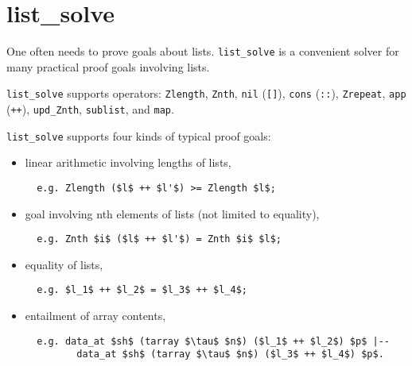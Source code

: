 \documentclass[12pt,fleqn,openany,oneside,showtrims]{memoir}
\begin{document}
\chapter{list\_solve}
\label{refcard:list_solve}

One often needs to prove goals about lists.
\lstinline{list_solve} is a convenient solver for many practical proof goals involving lists.

\lstinline{list_solve} supports operators:
\lstinline{Zlength},
\lstinline{Znth},
\lstinline{nil} (\lstinline{[]}),
\lstinline{cons} (\lstinline{::}),
\lstinline{Zrepeat},
\lstinline{app} (\lstinline{++}),
\lstinline{upd_Znth},
\lstinline{sublist}, and
\lstinline{map}.

\lstinline{list_solve} supports four kinds of typical proof goals:
\begin{itemize}
    \item linear arithmetic involving lengths of lists,
\begin{lstlisting}
  e.g. Zlength ($l$ ++ $l'$) >= Zlength $l$;
\end{lstlisting}
  \item goal involving nth elements of lists (not limited to equality),
\begin{lstlisting}
  e.g. Znth $i$ ($l$ ++ $l'$) = Znth $i$ $l$;
\end{lstlisting}
  \item equality of lists,
\begin{lstlisting}
  e.g. $l_1$ ++ $l_2$ = $l_3$ ++ $l_4$;
\end{lstlisting}
  \item entailment of array contents,
\begin{lstlisting}
  e.g. data_at $sh$ (tarray $\tau$ $n$) ($l_1$ ++ $l_2$) $p$ |--
         data_at $sh$ (tarray $\tau$ $n$) ($l_3$ ++ $l_4$) $p$.
\end{lstlisting}
\end{itemize}
\end{document}
